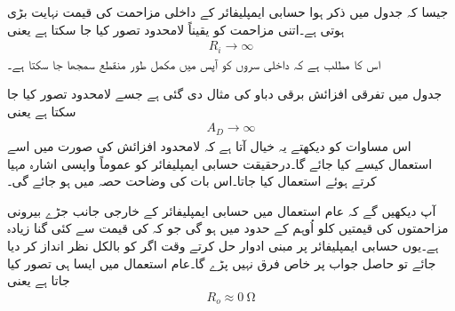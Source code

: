 
	جیسا کہ جدول  میں ذکر ہوا حسابی ایمپلیفائر کے داخلی مزاحمت کی قیمت نہایت بڑی ہوتی ہے۔اتنی مزاحمت کو یقیناً لامحدود تصور کیا جا سکتا ہے یعنی
\begin{align} \label{مساوات_حسابی_لامحدود_داخلی_مزاحمت}
R_i \to \infty
\end{align}
اس کا مطلب ہے کہ داخلی سروں کو آپس میں مکمل طور منقطع سمجھا جا سکتا ہے۔



جدول  میں تفرقی افزائش برقی دباو کی مثال  دی گئی ہے جسے لامحدود تصور کیا جا سکتا ہے یعنی
\begin{align}
A_D \to \infty
\end{align}
اس مساوات کو دیکھتے یہ خیال آتا ہے کہ لامحدود افزائش کی صورت میں اسے استعمال کیسے کیا جائے گا۔درحقیقت حسابی ایمپلیفائر کو عموماً واپسی اشارہ  مہیا کرتے ہوئے استعمال کیا جاتا۔اس بات کی وضاحت حصہ  میں ہو جائے گی۔


	
آپ دیکھیں گے کہ عام استعمال میں حسابی ایمپلیفائر کے خارجی جانب جڑے بیرونی مزاحمتوں کی قیمتیں کلو اُوہم   کے حدود میں ہو گی جو کہ   کی قیمت سے کئی گنا زیادہ ہے۔یوں حسابی ایمپلیفائر پر مبنی ادوار حل کرتے وقت اگر کو بالکل نظر انداز کر دیا جائے تو حاصل جواب پر خاص فرق نہیں پڑے گا۔عام استعمال میں ایسا ہی تصور کیا جاتا ہے یعنی
\begin{align} \label{مساوات_حسابی_صفر_خارجی_مزاحمت}
R_o \approx \SI{0}{\ohm}
\end{align}



